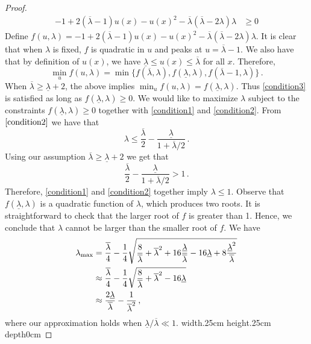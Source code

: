 \documentclass[11pt,reqno]{amsart}
\def\qed{ \hfill \vrule width.25cm height.25cm depth0cm\smallskip}
\begin{document}
{\begin{proof}
\begin{align}
        -1+2(\overline{\lambda}-1)u(x)-u(x)^2-\overline{\lambda}(\overline \lambda - 2\lambda)\lambda &\geq0 \label{condition3}
    \end{align}
    Define $f(u,\lambda) = -1+2(\overline{\lambda}-1)u(x)-u(x)^2-\overline{\lambda}(\overline \lambda - 2\lambda)\lambda$. It is clear that when $\lambda$ is fixed, $f$ is quadratic in $u$ and peaks at $u=\overline{\lambda}-1$. We also have that by definition of $u(x)$, we have $\underline \lambda \leq u(x) \leq \overline \lambda$ for all $x$.  Therefore,
    $$
    \min_u f(u,\lambda) = \min \{f(\overline{\lambda},\lambda),f(\underline\lambda,\lambda),f(\overline{\lambda}-1,\lambda)\}\,.
    $$
    When $\overline{\lambda}\geq\underline\lambda+2$, the above implies $\min_u f(u,\lambda) = f(\underline\lambda,\lambda)$. Thus \eqref{condition3} is satisfied as long as $f(\underline\lambda,\lambda)\geq 0$. We would like to maximize $\lambda$ subject to the constraints $f(\underline\lambda,\lambda)\geq 0$ together with \eqref{condition1} and \eqref{condition2}. From $\eqref{condition2}$ we have that 
    $$\lambda \leq \frac{\overline{ \lambda}}{2} - \frac{\underline \lambda}{1+\overline{ \lambda}/2}\,.$$
    Using our assumption $\overline{\lambda}\geq\underline\lambda+2$ we get that 
    $$
    \frac{\overline{ \lambda}}{2} - \frac{\underline \lambda}{1+\overline{ \lambda}/2} > 1\,.
    $$
    Therefore, \eqref{condition1} and \eqref{condition2} together imply $\lambda \leq 1$. Observe that $f(\underline \lambda,\lambda)$ is a quadratic function of $\lambda$, which produces two roots. It is straightforward to check that the larger root of $f$ is greater than 1. Hence, we conclude that $\lambda$ cannot be larger than the smaller root of $f$. We have 
    \begin{align}
        \lambda_{\rm max}  &= \frac{\overline{\lambda}}{4}- \frac{1}{4}\sqrt{\frac{8}{\overline{\lambda}}+\overline{\lambda}^2 + 16\frac{\underline\lambda}{\overline{\lambda}}-16\underline\lambda+8\frac{\underline\lambda^2}{\overline{\lambda}}}\\
        &\approx \frac{\overline{\lambda}}{4}-\frac{1}{4}\sqrt{\frac{8}{\overline{\lambda}}+\overline{\lambda}^2 -16\underline\lambda}\nonumber\\
        &\approx  \frac{2\underline{\lambda}}{\overline{\lambda}}-\frac{1}{\overline{\lambda}^2}\,,\nonumber
    \end{align}
    where our approximation holds when  $\underline\lambda/\overline{\lambda}\ll 1$. \qed
\end{proof}}
\end{document}
